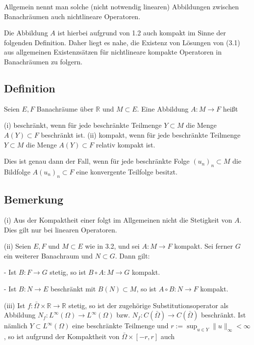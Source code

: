 \documentclass[10pt, letterpaper]{article}
\begin{document}
Allgemein nennt man solche (nicht notwendig linearen) Abbildungen zwischen Banachräumen auch nichtlineare Operatoren.

Die Abbildung $A$ ist hierbei aufgrund von 1.2 auch kompakt im Sinne der folgenden Definition. Daher liegt es nahe, die Existenz von Lösungen von (3.1) aus allgemeinen Existenzsätzen für nichtlineare kompakte Operatoren in Banachräumen zu folgern.

\subsection*{Definition}

Seien $E, F$ Banachräume über $\mathbb{R}$ und $M \subset E$. Eine Abbildung $A: M \rightarrow F$ heißt

(i) beschränkt, wenn für jede beschränkte Teilmenge $Y \subset M$ die Menge $A(Y) \subset F$ beschränkt ist.
(ii) kompakt, wenn für jede beschränkte Teilmenge $Y \subset M$ die Menge $A(Y) \subset F$ relativ kompakt ist.

Dies ist genau dann der Fall, wenn für jede beschränkte Folge $\left(u_{n}\right)_{n} \subset M$ die Bildfolge $A\left(u_{n}\right)_{n} \subset F$ eine konvergente Teilfolge besitzt.

\subsection*{Bemerkung}

(i) Aus der Kompaktheit einer folgt im Allgemeinen nicht die Stetigkeit von $A$. Dies gilt nur bei linearen Operatoren.

(ii) Seien $E, F$ und $M \subset E$ wie in 3.2, und sei $A: M \rightarrow F$ kompakt. Sei ferner $G$ ein weiterer Banachraum und $N \subset G$. Dann gilt:

- Ist $B: F \rightarrow G$ stetig, so ist $B \circ A: M \rightarrow G$ kompakt.

- Ist $B: N \rightarrow E$ beschränkt mit $B(N) \subset M$, so ist $A \circ B: N \rightarrow F$ kompakt.

(iii) Ist $f: \bar{\Omega} \times \mathbb{R} \rightarrow \mathbb{R}$ stetig, so ist der zugehörige Substitutionsoperator als Abbildung $N_{f}: L^{\infty}(\Omega) \rightarrow L^{\infty}(\Omega)$ bzw. $N_{f}: C(\bar{\Omega}) \rightarrow C(\bar{\Omega})$ beschränkt. Ist nämlich $Y \subset L^{\infty}(\Omega)$ eine beschränkte Teilmenge und $r:=\sup _{u \in Y}\|u\|_{\infty}<\infty$, so ist aufgrund der Kompaktheit von $\bar{\Omega} \times[-r, r]$ auch
\end{document}
